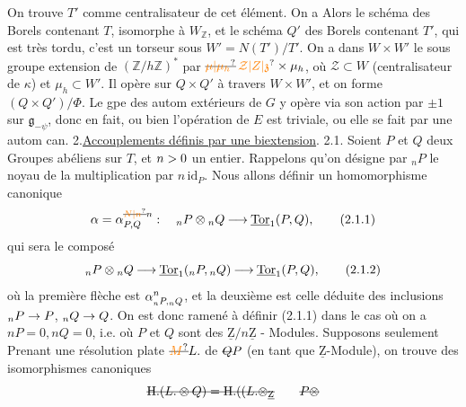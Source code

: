 On trouve $T'$ comme centralisateur  de cet élément.
On a  Alors le schéma des Borels  contenant $T$, isomorphe à $W_{\mathbb Z}$, et le schéma $Q'$ des Borels contenant $T'$, qui est très tordu,  c'est un torseur sous $W'=N(T')/T'$.
On a dans $W\times W'$ le sous groupe  extension de $(\mathbb Z/h\mathbb Z)^*$ par $\deleted{\unsure{\mu|\mu_h}}\,\unsure{\mathcal Z|Z|\mathfrak z}\times\mu_h$, où $\mathcal Z\subset W$ (centralisateur de $\kappa$) et $\mu_h\subset W'$. Il opère  sur $Q\times Q'$ à travers $W\times W'$, et on forme $(Q\times Q')/\Phi$.
Le gpe des autom extérieurs  de $G$ y opère via son action par $\pm1$ sur $\mathfrak g_{-\psi}$, donc en fait,  ou bien l'opération de $E$ est triviale, ou elle se fait par une autom can.
2.\uline{Accouplements définis par une biextension}.
2.1. Soient $P$ et $Q$ deux Groupes abéliens sur $T$, et $n>0$ un entier. Rappelons qu'on désigne par $\mathord{}_nP$ le noyau de la multiplication par $n\,\mathrm{id}_P$. Nous allons définir un homomorphisme canonique
\[ \handwritten{\alpha}=\handwritten{\alpha}^{\deleted{\unsure{N|n}}n}_{P,Q}:\quad {}_nP\otimes{}_nQ\mathbin{\handwritten{\longrightarrow}}\underline{\mathrm{Tor}}_1(P,Q),\tag*{(2.1.1)} \]
qui sera le composé
\[ {}_nP\otimes{}_nQ\mathbin{\longrightarrow}\underline{\mathrm{Tor}}_1({}_nP,{}_nQ)\mathbin{\longrightarrow}\underline{\mathrm{Tor}}_1(P,Q),\tag*{(2.1.2)} \]
où la première flèche est $\alpha^n_{{}_nP,{}_nQ}$, et la deuxième est celle déduite des inclusions $\mathord{}_nP\to P$, $\mathord{}_nQ\to Q$. On est donc ramené à définir (2.1.1) dans le cas où on a $nP=0,nQ=0$, i.e. où $P$ et $Q$ sont des $\underline{\mathrm Z}/n\underline{\mathrm Z}$ - Modules.
 Supposons seulement  Prenant une résolution plate $\deleted{\unsure{M}}L\mathord.$ de $\deleted{Q}P$
(en tant que $\underline{\mathrm Z}$-Module),  on trouve des isomorphismes canoniques
\[ \deleted{\mathrm H\mathord.(L\mathord.\otimes Q)=\mathrm H\mathord.((L\mathord.\otimes_{\underline{\mathrm Z}}}\qquad\deleted{P\otimes} \]

